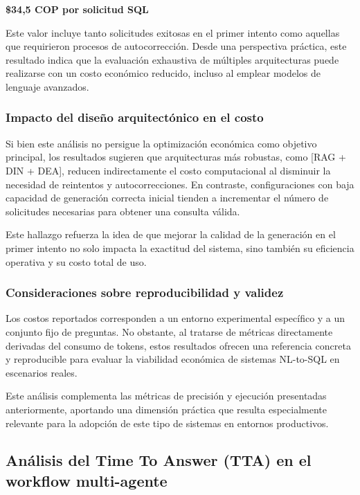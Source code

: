 \documentclass[journal]{IEEEtran}
\begin{document}
\begin{center}
	\textbf{\$34,5 COP por solicitud SQL}
\end{center}

Este valor incluye tanto solicitudes exitosas en el primer intento como aquellas que requirieron procesos de autocorrección. Desde una perspectiva práctica, este resultado indica que la evaluación exhaustiva de múltiples arquitecturas puede realizarse con un costo económico reducido, incluso al emplear modelos de lenguaje avanzados.

\subsubsection{Impacto del diseño arquitectónico en el costo}

Si bien este análisis no persigue la optimización económica como objetivo principal, los resultados sugieren que arquitecturas más robustas, como [RAG + DIN + DEA], reducen indirectamente el costo computacional al disminuir la necesidad de reintentos y autocorrecciones. En contraste, configuraciones con baja capacidad de generación correcta inicial tienden a incrementar el número de solicitudes necesarias para obtener una consulta válida.

Este hallazgo refuerza la idea de que mejorar la calidad de la generación en el primer intento no solo impacta la exactitud del sistema, sino también su eficiencia operativa y su costo total de uso.

\subsubsection{Consideraciones sobre reproducibilidad y validez}

Los costos reportados corresponden a un entorno experimental específico y a un conjunto fijo de preguntas. No obstante, al tratarse de métricas directamente derivadas del consumo de tokens, estos resultados ofrecen una referencia concreta y reproducible para evaluar la viabilidad económica de sistemas NL-to-SQL en escenarios reales.

Este análisis complementa las métricas de precisión y ejecución presentadas anteriormente, aportando una dimensión práctica que resulta especialmente relevante para la adopción de este tipo de sistemas en entornos productivos.

\subsection{Análisis del Time To Answer (TTA) en el workflow multi-agente}
\end{document}
